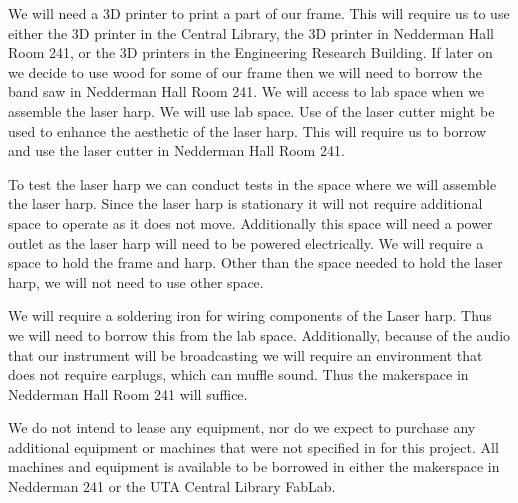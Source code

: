 We will need a 3D printer to print a part of our frame. This will require us to use either the 3D printer in the Central Library, the 3D printer in Nedderman Hall Room 241, or the 3D printers in the Engineering Research Building. If later on we decide to use wood for some of our frame then we will need to borrow the band saw in Nedderman Hall Room 241. We will access to lab space when we assemble the laser harp. We will use lab space. Use of the laser cutter might be used to enhance the aesthetic of the laser harp. This will require us to borrow and use the laser cutter in Nedderman Hall Room 241.

To test the laser harp we can conduct tests in the space where we will assemble the laser harp. Since the laser harp is stationary it will not require additional space to operate as it does not move. Additionally this space will need a power outlet as the laser harp will need to be powered electrically. We will require a space to hold the frame and harp. Other than the space needed to hold the laser harp, we will not need to use other space.

We will require a soldering iron for wiring components of the Laser harp. Thus we will need to borrow this from the lab space. Additionally, because of the audio that our instrument will be broadcasting we will require an environment that does not require earplugs, which can muffle sound. Thus the makerspace in Nedderman Hall Room 241 will suffice.

We do not intend to lease any equipment, nor do we expect to purchase any additional equipment or machines that were not specified in for this project. All machines and equipment is available to be borrowed in either the makerspace in Nedderman 241 or the UTA Central Library FabLab.
